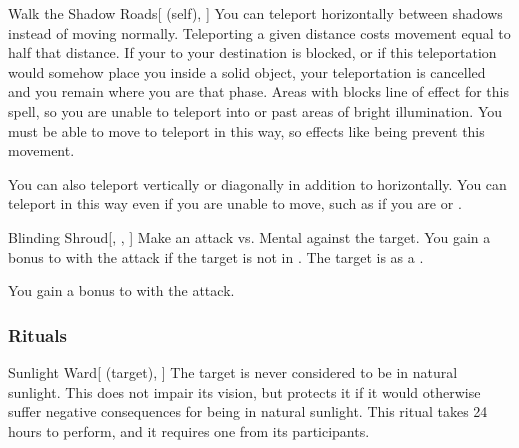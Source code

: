 \lowercase{\hypertarget{spell:Walk the Shadow Roads}{}}\label{spell:Walk the Shadow Roads}
\begin{attuneability}[Rank 4]{\hypertarget{spell:Walk the Shadow Roads}{Walk the Shadow Roads}}[ (self), ]
You can teleport horizontally between shadows instead of moving normally.
Teleporting a given distance costs movement equal to half that distance.
If your  to your destination is blocked, or if this teleportation would somehow place you inside a solid object, your teleportation is cancelled and you remain where you are that phase.
Areas with  blocks line of effect for this spell, so you are unable to teleport into or past areas of bright illumination.
You must be able to move to teleport in this way, so effects like being  prevent this movement.

\rankline
{} You can also teleport vertically or diagonally in addition to horizontally.
 You can teleport in this way even if you are unable to move, such as if you are  or .

\end{attuneability}
\vspace{0.25em}



\lowercase{\hypertarget{spell:Blinding Shroud}{}}\label{spell:Blinding Shroud}
\begin{freeability}[Rank 6]{\hypertarget{spell:Blinding Shroud}{Blinding Shroud}}[, , ]
Make an attack vs. Mental against the target.
You gain a  bonus to  with the attack if the target is not in .
\hit The target is  as a .

\rankline
{} You gain a  bonus to  with the attack.

\end{freeability}
\vspace{0.25em}



\subsubsection{Rituals}


\lowercase{\hypertarget{spell:Sunlight Ward}{}}\label{spell:Sunlight Ward}
\begin{attuneability}[Rank 3]{\hypertarget{spell:Sunlight Ward}{Sunlight Ward}}[ (target), ]
The target is never considered to be in natural sunlight.
This does not impair its vision, but protects it if it would otherwise suffer negative consequences for being in natural sunlight.
This ritual takes 24 hours to perform, and it requires one  from its participants.
\end{attuneability}
\vspace{0.25em}


